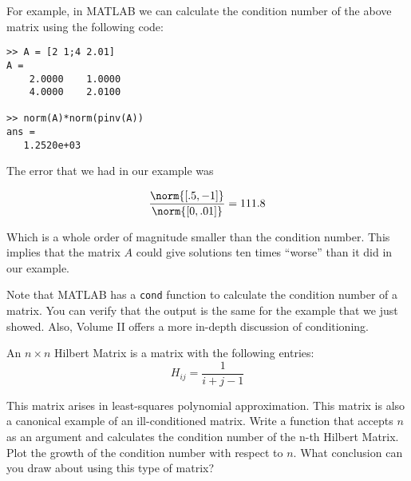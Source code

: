 For example, in MATLAB we can calculate the condition number of the above matrix using the following code:

\begin{verbatim}
>> A = [2 1;4 2.01]
A =
    2.0000    1.0000
    4.0000    2.0100

>> norm(A)*norm(pinv(A))
ans =
   1.2520e+03
\end{verbatim}

The error that we had in our example was

\[
\frac{\norm{[.5, -1]}}{\norm{[0, .01]}} = 111.8
\]

Which is a whole order of magnitude smaller than the condition number. This implies that the matrix $A$ could give solutions ten times ``worse'' than it did in our example.

Note that MATLAB has a {\tt cond} function to calculate the condition number of a matrix. You can verify that the output is the same for the example that we just showed. Also, Volume II offers a more in-depth discussion of conditioning.

\begin{problem}
An $n \times n$ Hilbert Matrix is a matrix with the following entries:
\[
H_{ij} = \frac{1}{i + j -1}
\]

This matrix arises in least-squares polynomial approximation. This matrix is also a canonical example of an ill-conditioned matrix. Write a function that accepts $n$ as an argument and calculates the condition number of the n-th Hilbert Matrix. Plot the growth of the condition number with respect to $n$. What conclusion can you draw about using this type of matrix? 
\end{problem}
